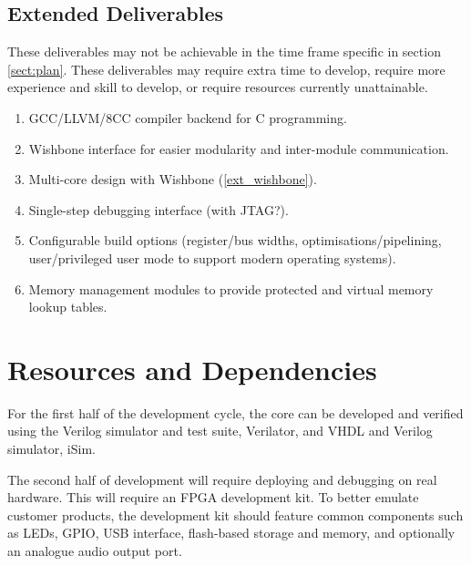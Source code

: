 \documentclass[11pt,a4paper]{article}
\begin{document}
\subsection{Extended Deliverables}
These deliverables may not be achievable in the time frame specific in section \ref{sect:plan}. These deliverables may require extra time to develop, require more experience and skill to develop, or require resources currently unattainable.

\begin{enumerate}
\item{GCC/LLVM/8CC compiler backend for C programming.}
\item{Wishbone interface for easier modularity and inter-module communication.}\label{ext_wishbone}
\item{Multi-core design with Wishbone (\ref{ext_wishbone}).}
\item{Single-step debugging interface (with JTAG?).}
\item{Configurable build options (register/bus widths, optimisations/pipelining, user/privileged user mode to support modern operating systems).}
\item{Memory management modules to provide protected and virtual memory lookup tables.}
\end{enumerate}

\section{Resources and Dependencies}
For the first half of the development cycle, the core can be developed and verified using the Verilog simulator and test suite, Verilator, and VHDL and Verilog simulator, iSim.

The second half of development will require deploying and debugging on real hardware. This will require an FPGA development kit. To better emulate customer products, the development kit should feature common components such as LEDs, GPIO, USB interface, flash-based storage and memory, and optionally an analogue audio output port.
\end{document}
